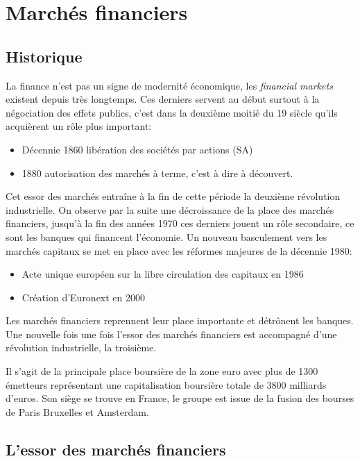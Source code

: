 \documentclass[main.tex]{subfiles}
\begin{document}
        
\chapter{Marchés financiers}

\section{Historique}

La finance n'est pas un signe de modernité économique, les \textit{financial markets} existent depuis très longtemps. Ces derniers servent au début surtout à la négociation des effets publics, c'est dans la deuxième moitié du 19 siècle qu'ils acquièrent un rôle plus important:
\begin{itemize}
        \item Décennie 1860 libération des sociétés par actions (SA)
        \item 1880 autorisation des marchés à terme, c'est à dire à découvert. 
\end{itemize}
Cet essor des marchés entraîne à la fin de cette période la deuxième révolution industrielle. On observe par la suite une décroissance de la place des marchés financiers, jusqu'à la fin des années 1970 ces derniers jouent un rôle secondaire, ce sont les banques qui financent l'économie. Un nouveau basculement vers les marchés capitaux se met en place avec les réformes majeures de la décennie 1980:
\begin{itemize}
        \item Acte unique européen sur la libre circulation des capitaux en 1986 
        \item Création d'Euronext en 2000 
\end{itemize}
Les marchés financiers reprennent leur place importante et détrônent les banques. Une nouvelle fois une fois l'essor des marchés financiers est accompagné d'une révolution industrielle, la troisième.

\begin{definition}[Euronext]
        Il s'agit de la principale place boursière de la zone euro avec plus de 1300 émetteurs représentant une capitalisation boursière totale de 3800 milliards d’euros. Son siège se trouve en France, le groupe est issue de la fusion des bourses de Paris Bruxelles et Amsterdam.
\end{definition}

\section{L'essor des marchés financiers}
\end{document}
